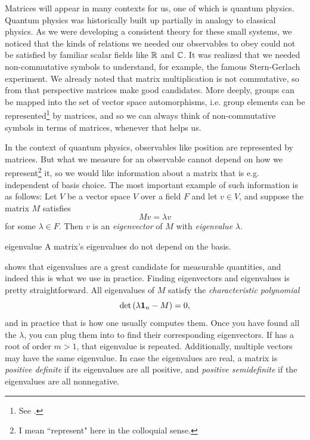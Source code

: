 Matrices will appear in many contexts for us, one of which
is quantum physics. Quantum physics was historically built up partially in
analogy to classical physics. As we were developing a consistent theory for these
small systems, we noticed that the kinds of relations we needed our observables
to obey could not be satisfied by familiar scalar fields like $\mathbb{R}$ and $\mathbb{C}$.
It was realized that we needed non-commutative symbols to understand,
for example, the famous Stern-Gerlach experiment. We already noted that matrix
multiplication is not commutative, so from that perspective matrices make good
candidates. More deeply, groups can be mapped into the set of
vector space automorphisms,
i.e. group elements can be 
represented\footnote{See .} by matrices,
and so we can always think of non-commutative symbols in terms of matrices,
whenever that helps us.

In the context of quantum physics, observables like position are represented by
matrices. But what we measure for an observable cannot depend on how we
represent\footnote{I mean ``represent" here in the colloquial sense.} it,
so we would like information about a matrix that is e.g. independent of
basis choice. The most important example of such information is as follows:
Let $V$ be a vector space $V$ over a field $F$ and let $v\in V$,
and suppose the matrix $M$ satisfies
\begin{equation}\label{eq:eigen}
Mv = \lambda v
\end{equation}
for some $\lambda\in F$. Then $v$ is an {\it eigenvector} 
of $M$ with {\it eigenvalue} $\lambda$.

\begin{proposition}{}{eigenvalue}
  A matrix's eigenvalues do not depend on the basis. 
\end{proposition}

 shows that eigenvalues are a great candidate
for measurable quantities, and indeed this is what we use in practice.
Finding eigenvectors and eigenvalues is pretty straightforward.
All eigenvalues of $M$ satisfy the
{\it characteristic polynomial}
\begin{equation}\label{eq:characteristicPolynomial}
\det\left(\lambda{\mathbf 1}_n-M\right)=0,
\end{equation}
and in practice that is how one usually computes them.
Once you have found all the $\lambda$, you can plug them
into  to find their corresponding
eigenvectors. If 
has a root of order $m>1$, that eigenvalue is repeated.
Additionally, multiple vectors may have the same eigenvalue.
In case the eigenvalues are real, a matrix is
{\it positive definite} 
if its eigenvalues are all positive, and
{\it positive semidefinite} 
if the eigenvalues are all nonnegative.

